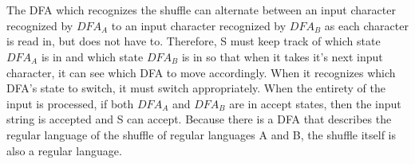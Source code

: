 \documentclass[12pt]{article}
\begin{document}
\\
\\
The DFA which recognizes the shuffle can alternate between an input character recognized by $DFA_A$ to an input character recognized by $DFA_B$ as each character is read in, but does not have to. Therefore, S must keep track of which state $DFA_A$ is in and which state $DFA_B$ is in so that when it takes it's next input character, it can see which DFA to move accordingly. When it recognizes which DFA's state to switch, it must switch appropriately.  When the entirety of the input is processed, if both $DFA_A$ and $DFA_B$ are in accept states, then the input string is accepted and S can accept. Because there is a DFA that describes the regular language of the shuffle of regular languages A and B, the shuffle itself is also a regular language. 
\end{document}
